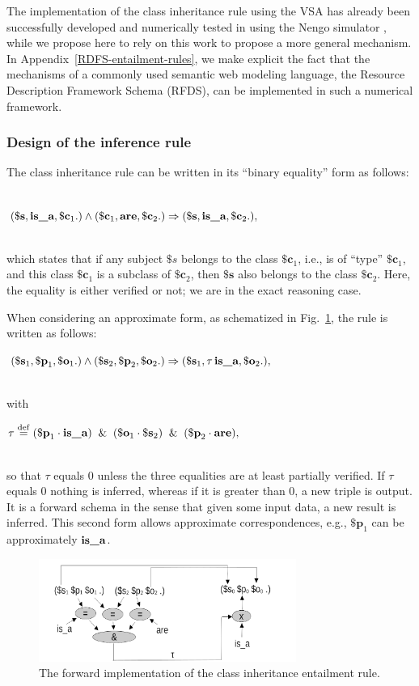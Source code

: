 \documentclass[sn-mathphys]{sn-jnl}
\newcommand{\defq}{\stackrel {\rm def}{=}}
\newcommand{\eqline}[1]{~\vspace{0.1cm}\\\centerline{$#1$}\vspace{0.1cm}\\}
\begin{document}
The implementation of the class inheritance rule using the VSA has already been successfully developed and numerically tested in \cite{mercier_ontology_2021} using the Nengo simulator \cite{bekolay_nengo_2014}, while we propose here to rely on this work to propose a more general mechanism. In Appendix~\ref{RDFS-entailment-rules}, we make explicit the fact that the mechanisms of a commonly used semantic web modeling language, the Resource Description Framework Schema (RFDS), can be implemented in such a numerical framework.

\subsubsection{Design of the inference rule}

The class inheritance rule can be written in its ``binary equality'' form as follows:
\eqline{(\mathbf{\$s} ,  \texttt{\bf is\_a} ,  \mathbf{\$c}_1 .) \wedge (\mathbf{\$c}_1 ,  \texttt{\bf are} ,  \mathbf{\$c}_2 .) \Rightarrow (\mathbf{\$s} ,  \texttt{\bf is\_a} ,  \mathbf{\$c}_2 .),}
which states that if any subject $\$s$ belongs to the class $\mathbf{\$c}_1$, i.e., is of ``type'' $\mathbf{\$c}_1$, and this class $\mathbf{\$c}_1$ is a subclass of $\mathbf{\$c}_2$, then $\mathbf{\$s}$ also belongs to the class $\mathbf{\$c}_2$. Here, the equality is either verified or not; we are in the exact reasoning case.

When considering an approximate form, as schematized in Fig.~\ref{rdfs9-derivation}, the rule is written as follows:
\eqline{(\mathbf{\$s}_1 ,  \mathbf{\$p}_1 ,  \mathbf{\$o}_1 .) \wedge (\mathbf{\$s}_2 ,  \mathbf{\$p}_2 ,  \mathbf{\$o}_2 .) \Rightarrow (\mathbf{\$s}_1, \tau \, \texttt{\bf is\_a}, \mathbf{\$o}_2 .),}
with
\eqline{\tau \defq (\mathbf{\$p}_1 \cdot \texttt{\bf is\_a}) \And (\mathbf{\$o}_1 \cdot \mathbf{\$s}_2) \And (\mathbf{\$p}_2 \cdot \texttt{\bf are}),}
so that $\tau$ equals $0$ unless the three equalities are at least partially verified. If $\tau$ equals $0$ nothing is inferred, whereas if it is greater than $0$, a new triple is output. It is a forward schema in the sense that given some input data, a new result is inferred. This second form allows approximate correspondences, e.g., $\mathbf{\$p}_1$ can be approximately $\texttt{\bf is\_a}$.

\begin{figure}[htbp]
\centerline{\includegraphics[width=0.75\textwidth]{./rdfs9-derivation.png}}
\caption{The forward implementation of the class inheritance entailment rule.}
\label{rdfs9-derivation}
\end{figure}
\end{document}
